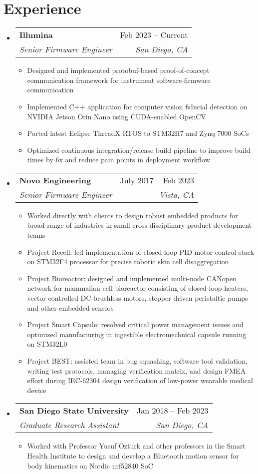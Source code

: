 \documentclass[letterpaper,11pt]{article}
\makeatletter
\newcommand{\resumeItem}[1]{
  \item\small{
    {#1 \vspace{-2pt}}
  }
}
\newcommand{\resumeSubheading}[4]{
  \vspace{-2pt}\item
    \begin{tabular*}{0.97\textwidth}[t]{l@{\extracolsep{\fill}}r}
      \textbf{#1} & #2 \\
      \textit{\small#3} & \textit{\small #4} \\
    \end{tabular*}\vspace{-7pt}
}
\newcommand{\resumeSubHeadingListStart}{\begin{itemize}[leftmargin=0.15in, label={}]}
\newcommand{\resumeSubHeadingListEnd}{\end{itemize}}
\newcommand{\resumeItemListStart}{\begin{itemize}}
\newcommand{\resumeItemListEnd}{\end{itemize}\vspace{-5pt}}
\makeatother
\begin{document}
\section{Experience}
  \resumeSubHeadingListStart
    \resumeSubheading
      {Illumina}{Feb 2023 -- Current}
      {Senior Firmware Engineer}{San Diego, CA}
      \resumeItemListStart
        \resumeItem{Designed and implemented protobuf-based proof-of-concept communication framework for instrument software-firmware communication}
        \resumeItem{Implemented C++ application for computer vision fiducial detection on NVIDIA Jetson Orin Nano using CUDA-enabled OpenCV}
        \resumeItem{Ported latest Eclipse ThreadX RTOS to STM32H7 and Zynq 7000 SoCs}
        \resumeItem{Optimized continuous integration/release build pipeline to improve build times by 6x and reduce pain points in deployment workflow}
      \resumeItemListEnd
    \resumeSubheading
      {Novo Engineering}{July 2017 -- Feb 2023}
      {Senior Firmware Engineer}{Vista, CA}
      \resumeItemListStart
      \resumeItem{Worked directly with clients to design robust embedded products for broad range of industries in small cross-disciplinary
      product development teams}
        \resumeItem{Project Recell: led implementation of closed-loop PID motor control stack on STM32F4 processor for precise robotic skin cell disaggregation}
        \resumeItem{Project Bioreactor: designed and implemented multi-node CANopen network for mammalian cell bioreactor consisting of closed-loop heaters, vector-controlled DC brushless motors, stepper driven peristaltic pumps and other embedded sensors}     
        \resumeItem{Project Smart Capsule: resolved critical power management issues and optimized manufacturing in ingestible electromechnical capsule running on STM32L0}
        \resumeItem{Project BEST: assisted team in bug squashing, software tool validation, writing test protocols, managing verification matrix, and design FMEA effort during IEC-62304 design verification of low-power wearable medical device }
        \resumeItemListEnd
    \resumeSubheading
      {San Diego State University}{Jan 2018 -- Feb 2023}
      {Graduate Research Assistant}{San Diego, CA}
      \resumeItemListStart
        \resumeItem{Worked with Professor Yusuf Ozturk and other professors in the Smart Health Institute to design and develop a Bluetooth motion sensor for body kinematics on Nordic nrf52840 SoC}
      \resumeItemListEnd
  \resumeSubHeadingListEnd

\end{document}
